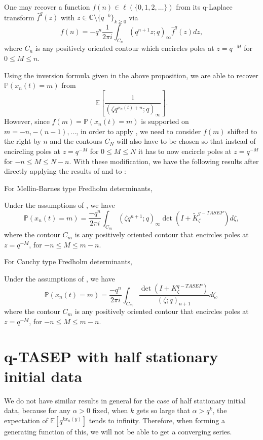 \begin{proposition}
\label{inversion-formula}
One may recover a function $f(n) \in \ell(\{0,1,2,\dots \})$ from its q-Laplace transform $\hat{f}^q(z)$ with $z \in \mathbb{C} \setminus \{q^{-k}\}_{k \ge 0}$ via
$$f(n) = -q^n \frac{1}{2 \pi i} \int_{C_n} (q^{n+1}z; q)_{\infty} \hat{f}^q(z) dz,$$ 
where $C_n$ is any positively oriented contour which encircles poles at $z = q^{-M}$ for $0 \le M \le n$.
\end{proposition}

Using the inversion formula given in the above proposition, we are able to recover $\mathbb{P}(x_n(t) = m)$ from $$\mathbb{E}\left[ \frac{1}{(\zeta q^{x_n(t) + n}; q)_{\infty}} \right].$$ However, since $f(m) = \mathbb{P}(x_n(t) = m)$ is supported on $m = -n, -(n-1), \dots$, in order to apply , we need to consider $f(m)$ shifted to the right by $n$ and the contours $C_N$ will also have to be chosen so that instead of encircling poles at $z = q^{-M}$ for $0 \le M \le N$ it has to now encircle poles at $z = q^{-M}$ for $-n \le M \le N-n$. With these modification, we have the following results after directly applying the results of  and  to :

For Mellin-Barnes type Fredholm determinants, 
\begin{proposition}
Under the assumptions of , we have $$\mathbb{P}(x_n(t) = m) = \frac{-q^n}{2 \pi i} \int_{C_m} (\zeta q^{n+1}; q)_{\infty} \det(I+\tilde{K}_{\zeta}^{q-TASEP}) d\zeta,$$ where the contour $C_m$ is any positively oriented contour that encircles poles at $z = q^{-M}$, for $-n \le M \le m-n$.
\end{proposition}

For Cauchy type Fredholm determinants, 
\begin{proposition}
Under the assumptions of , we have $$\mathbb{P}(x_n(t) = m) = \frac{-q^n}{2 \pi i} \int_{C_m} \frac{\det(I+K_{\zeta}^{q-TASEP})}{(\zeta;q)_{n+1}} d\zeta,$$ where the contour $C_m$ is any positively oriented contour that encircles poles at $z = q^{-M}$, for $-n \le M \le m-n$.
\end{proposition}
\section{q-TASEP with half stationary initial data}
We do not have similar results in general for the case of half stationary initial data, because for any $\alpha > 0$ fixed, when $k$ gets so large that $\alpha > q^k$, the expectation of $\mathbb{E} \left[ q^{kx_n(y)} \right]$ tends to infinity. Therefore, when forming a generating function of this, we will not be able to get a converging series. 
